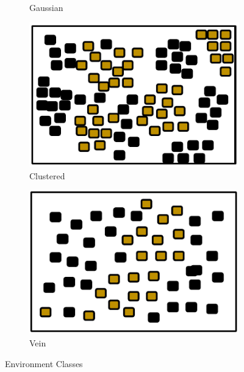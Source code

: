 \begin{figure} [h]
\begin{subfigure}[b]{0.2\textwidth}
                        \caption{Gaussian}
                        \label{fig:gaussianenv}
       \end{subfigure}
        \begin{subfigure}[b]{0.205\textwidth}
                \includegraphics[width=\textwidth]{chapters/chapter4/figures/clusterenv.pdf}
                \caption{Clustered}
                \label{fig:clusterenv}
        \end{subfigure}
        \begin{subfigure}[b]{0.2\textwidth}
                \includegraphics[width=\textwidth]{chapters/chapter4/figures/veinenv.pdf}
                \caption{Vein}
                \label{fig:veinenv}
        \end{subfigure}  

		\caption{Environment Classes}
		\label{fig:environments}
\end{figure}

